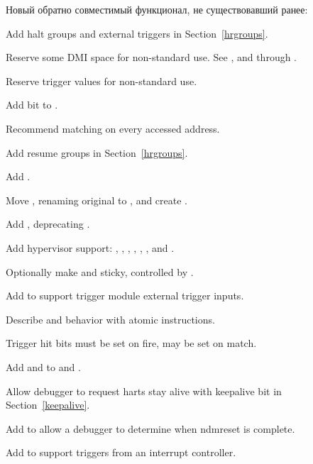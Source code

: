 \begin{steps}{Новый обратно совместимый функционал, не существовавший ранее:}
    \item Add halt groups and external triggers in Section~\ref{hrgroups}. 
    \item Reserve some DMI space for non-standard use. See \RdmCustom, and
        \RdmCustomZero through \RdmCustomFifteen. 
    \item Reserve trigger \FcsrTdataOneType values for non-standard use. 
    \item Add \FcsrEtriggerNmi bit to \RcsrEtrigger. 
    \item Recommend matching on every accessed address. 
    \item Add resume groups in Section~\ref{hrgroups}. 
    \item Add \FdmAbstractcsRelaxedpriv. 
    \item Move \RcsrScontext, renaming original to \RcsrMscontext, and create
        \RcsrHcontext. 
    \item Add \RcsrMcontrolSix, deprecating \RcsrMcontrol. 
    \item Add hypervisor support: \FcsrDcsrEbreakvs, \FcsrDcsrEbreakvu,
        \FcsrDcsrV, \RcsrHcontext, \RcsrMcontrol, \RcsrMcontrolSix, and
        \RvirtPriv. 
    \item Optionally make \FdmDmstatusAnyunavail and \FdmDmstatusAllunavail
    sticky, controlled by \FdmDmstatusStickyunavail. 
    \item Add \RcsrTmexttrigger to support trigger module external trigger
        inputs. 
    \item Describe \RcsrMcontrol and \RcsrMcontrolSix behavior with atomic instructions. 
    \item Trigger hit bits must be set on fire, may be set on match. 
    \item Add \FcsrTextraThirtytwoSbytemask and \FcsrTextraSixtyfourSbytemask
        to \RcsrTextraThirtytwo and \RcsrTextraSixtyfour. 
    \item Allow debugger to request harts stay alive with keepalive bit in
        Section~\ref{keepalive}. 
    \item Add \FdmDmstatusNdmresetpending to allow a debugger to determine
        when ndmreset is complete. 
    \item Add \FcsrTmexttriggerIntctl to support triggers from an interrupt controller. 
\end{steps}
